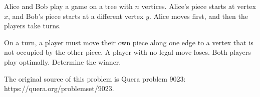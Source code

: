 Alice and Bob play a game on a tree with $n$ vertices. Alice's piece starts at vertex $x$, and Bob's piece starts at a different vertex $y$. Alice moves first, and then the players take turns.

On a turn, a player must move their own piece along one edge to a vertex that is not occupied by the other piece. A player with no legal move loses. Both players play optimally. Determine the winner.

The original source of this problem is Quera problem 9023: https://quera.org/problemset/9023.

